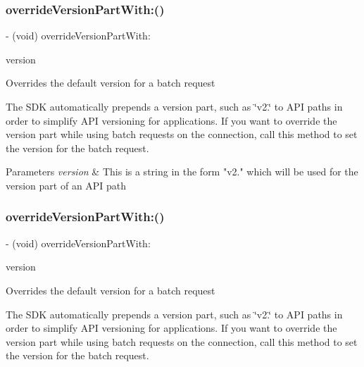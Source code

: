 \subsubsection{\texorpdfstring{override\+Version\+Part\+With\+:()}{overrideVersionPartWith:()}\hspace{0.1cm}{\footnotesize\ttfamily [4/5]}}
{\footnotesize\ttfamily -\/ (void) override\+Version\+Part\+With\+: \begin{DoxyParamCaption}\item[{(N\+S\+String $\ast$)}]{version }\end{DoxyParamCaption}}

Overrides the default version for a batch request

The S\+DK automatically prepends a version part, such as \char`\"{}v2.\char`\"{} to A\+PI paths in order to simplify A\+PI versioning for applications. If you want to override the version part while using batch requests on the connection, call this method to set the version for the batch request.


\begin{DoxyParams}{Parameters}
{\em version} & This is a string in the form "v2." which will be used for the version part of an A\+PI path \\
\hline
\end{DoxyParams}
\mbox{\label{interfaceFBRequestConnection_a225e5854a3413c22bff120114889ad07}} 
\subsubsection{\texorpdfstring{override\+Version\+Part\+With\+:()}{overrideVersionPartWith:()}\hspace{0.1cm}{\footnotesize\ttfamily [5/5]}}
{\footnotesize\ttfamily -\/ (void) override\+Version\+Part\+With\+: \begin{DoxyParamCaption}\item[{(N\+S\+String $\ast$)}]{version }\end{DoxyParamCaption}}

Overrides the default version for a batch request

The S\+DK automatically prepends a version part, such as \char`\"{}v2.\char`\"{} to A\+PI paths in order to simplify A\+PI versioning for applications. If you want to override the version part while using batch requests on the connection, call this method to set the version for the batch request.


